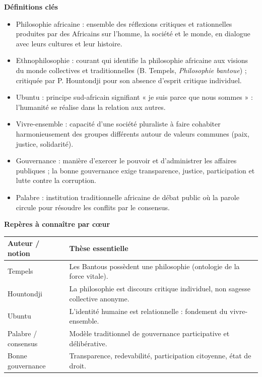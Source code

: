 \documentclass[11pt]{article}
\newcommand{\cle}[1]{{\popxbold\color{popdark}#1}}
\begin{document}
\begin{bilan}
\textbf{Définitions clés}
\begin{itemize}
  \item \cle{Philosophie africaine} : ensemble des réflexions critiques et rationnelles produites par des Africains sur l'homme, la société et le monde, en dialogue avec leurs cultures et leur histoire.
  \item \cle{Ethnophilosophie} : courant qui identifie la philosophie africaine aux visions du monde collectives et traditionnelles (B. Tempels, \emph{Philosophie bantoue}) ; critiquée par P. Hountondji pour son absence d'esprit critique individuel.
  \item \cle{Ubuntu} : principe sud-africain signifiant « je suis parce que nous sommes » : l'humanité se réalise dans la relation aux autres.
  \item \cle{Vivre-ensemble} : capacité d'une société pluraliste à faire cohabiter harmonieusement des groupes différents autour de valeurs communes (paix, justice, solidarité).
  \item \cle{Gouvernance} : manière d'exercer le pouvoir et d'administrer les affaires publiques ; la \cle{bonne gouvernance} exige transparence, justice, participation et lutte contre la corruption.
  \item \cle{Palabre} : institution traditionnelle africaine de débat public où la parole circule pour résoudre les conflits par le consensus.
\end{itemize}

\textbf{Repères à connaître par cœur}
\begin{center}
\begin{tabularx}{\linewidth}{|l|X|}\hline
\rowcolor{popblueL} \textbf{Auteur / notion} & \textbf{Thèse essentielle} \\ \hline
Tempels & Les Bantous possèdent une philosophie (ontologie de la force vitale). \\ \hline
Hountondji & La philosophie est discours critique individuel, non sagesse collective anonyme. \\ \hline
Ubuntu & L'identité humaine est relationnelle : fondement du vivre-ensemble. \\ \hline
Palabre / consensus & Modèle traditionnel de gouvernance participative et délibérative. \\ \hline
Bonne gouvernance & Transparence, redevabilité, participation citoyenne, état de droit. \\ \hline
\end{tabularx}
\end{center}


\end{bilan}
\end{document}
